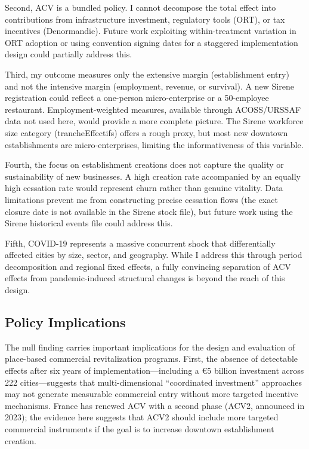 \documentclass[12pt]{article}
\begin{document}
Second, ACV is a bundled policy. I cannot decompose the total effect into contributions from infrastructure investment, regulatory tools (ORT), or tax incentives (Denormandie). Future work exploiting within-treatment variation in ORT adoption or using convention signing dates for a staggered implementation design could partially address this.

Third, my outcome measures only the extensive margin (establishment entry) and not the intensive margin (employment, revenue, or survival). A new Sirene registration could reflect a one-person micro-enterprise or a 50-employee restaurant. Employment-weighted measures, available through ACOSS/URSSAF data not used here, would provide a more complete picture. The Sirene workforce size category (trancheEffectifs) offers a rough proxy, but most new downtown establishments are micro-enterprises, limiting the informativeness of this variable.

Fourth, the focus on establishment creations does not capture the quality or sustainability of new businesses. A high creation rate accompanied by an equally high cessation rate would represent churn rather than genuine vitality. Data limitations prevent me from constructing precise cessation flows (the exact closure date is not available in the Sirene stock file), but future work using the Sirene historical events file could address this.

Fifth, COVID-19 represents a massive concurrent shock that differentially affected cities by size, sector, and geography. While I address this through period decomposition and regional fixed effects, a fully convincing separation of ACV effects from pandemic-induced structural changes is beyond the reach of this design.

\subsection{Policy Implications}

The null finding carries important implications for the design and evaluation of place-based commercial revitalization programs. First, the absence of detectable effects after six years of implementation---including a \euro 5 billion investment across 222 cities---suggests that multi-dimensional ``coordinated investment'' approaches may not generate measurable commercial entry without more targeted incentive mechanisms. France has renewed ACV with a second phase (ACV2, announced in 2023); the evidence here suggests that ACV2 should include more targeted commercial instruments if the goal is to increase downtown establishment creation.
\end{document}
